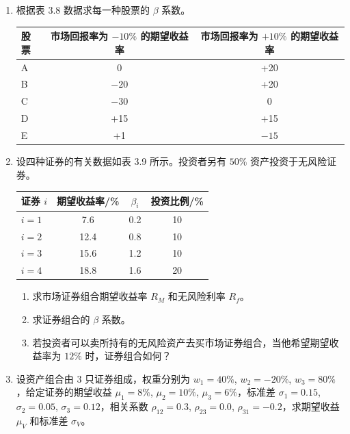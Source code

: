 \documentclass{article}
\begin{document}
\begin{enumerate}[label=\textbf{\arabic*.}]
\item 根据表 3.8 数据求每一种股票的 \(\beta\) 系数。


\begin{center}
\begin{tabular}{lcc}
\toprule
股票 & 市场回报率为 \(-10\%\) 的期望收益率 & 市场回报率为 \(+10\%\) 的期望收益率 \\
\midrule
A & 0 & +20 \\
B & \(-20\) & +20 \\
C & \(-30\) & 0 \\
D & +15 & +15 \\
E & +1 & \(-15\) \\
\bottomrule
\end{tabular}
\end{center}

\item 设四种证券的有关数据如表 3.9 所示。投资者另有 \(50\%\) 资产投资于无风险证券。


\begin{center}
\begin{tabular}{lccc}
\toprule
证券 \(i\) & 期望收益率/\% & \(\beta_i\) & 投资比例/\% \\
\midrule
\(i=1\) & 7.6 & 0.2 & 10 \\
\(i=2\) & 12.4 & 0.8 & 10 \\
\(i=3\) & 15.6 & 1.2 & 10 \\
\(i=4\) & 18.8 & 1.6 & 20 \\
\bottomrule
\end{tabular}
\end{center}

\begin{enumerate}[label=(\arabic*), leftmargin=*]
    \item 求市场证券组合期望收益率 \(R_M\) 和无风险利率 \(R_f\)。
    \item 求证券组合的 \(\beta\) 系数。
    \item 若投资者可以卖所持有的无风险资产去买市场证券组合，当他希望期望收益率为 \(12\%\) 时，证券组合如何？
\end{enumerate}

\item 设资产组合由 3 只证券组成，权重分别为 \(w_1=40\%\), \(w_2=-20\%\), \(w_3=80\%\)，给定证券的期望收益 \(\mu_1=8\%\), \(\mu_2=10\%\), \(\mu_3=6\%\)，标准差 \(\sigma_1=0.15\), \(\sigma_2=0.05\), \(\sigma_3=0.12\)，相关系数 \(\rho_{12}=0.3\), \(\rho_{23}=0.0\), \(\rho_{31}=-0.2\)，求期望收益 \(\mu_V\) 和标准差 \(\sigma_V\)。


\end{enumerate}
\end{document}
